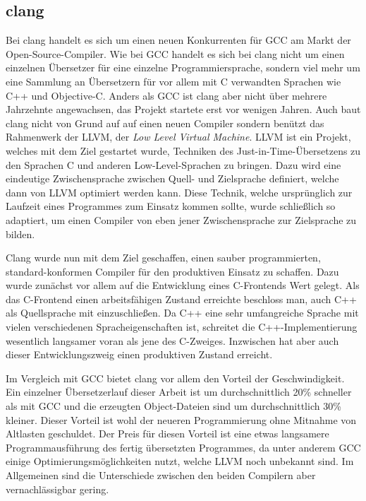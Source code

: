 \subsection{clang}
Bei clang handelt es sich um einen neuen Konkurrenten für GCC am Markt der Open-Source-Compiler. Wie bei GCC handelt es sich bei clang nicht um einen einzelnen Übersetzer für eine einzelne Programmiersprache,
sondern viel mehr um eine Sammlung an Übersetzern für vor allem mit C verwandten Sprachen wie C++ und Objective-C. Anders als GCC ist clang aber nicht über mehrere Jahrzehnte angewachsen, das Projekt
startete erst vor wenigen Jahren. Auch baut clang nicht von Grund auf auf einen neuen Compiler sondern benützt das Rahmenwerk der LLVM, der \textit{Low Level Virtual Machine}. LLVM ist ein Projekt, welches
mit dem Ziel gestartet wurde, Techniken des Just-in-Time-Übersetzens zu den Sprachen C und anderen Low-Level-Sprachen zu bringen. Dazu wird eine eindeutige Zwischensprache zwischen Quell- und Zielsprache
definiert, welche dann von LLVM optimiert werden kann. Diese Technik, welche ursprünglich zur Laufzeit eines Programmes zum Einsatz kommen sollte, wurde schließlich so adaptiert, um einen Compiler von
eben jener Zwischensprache zur Zielsprache zu bilden. 

Clang wurde nun mit dem Ziel geschaffen, einen sauber programmierten, standard-konformen Compiler für den produktiven Einsatz zu schaffen. Dazu wurde zunächst vor allem auf die Entwicklung eines C-Frontends
Wert gelegt. Als das C-Frontend einen arbeitsfähigen Zustand erreichte beschloss man, auch C++ als Quellsprache mit einzuschließen. Da C++ eine sehr umfangreiche Sprache mit vielen verschiedenen Spracheigenschaften 
ist, schreitet die C++-Implementierung wesentlich langsamer voran als jene des C-Zweiges. Inzwischen hat aber auch dieser Entwicklungszweig einen produktiven Zustand erreicht. 

Im Vergleich mit GCC bietet clang vor allem den Vorteil der Geschwindigkeit. Ein einzelner Übersetzerlauf dieser Arbeit ist um durchschnittlich 20\% schneller als mit GCC und die erzeugten Object-Dateien
sind um durchschnittlich 30\% kleiner. Dieser Vorteil ist wohl der neueren Programmierung ohne Mitnahme von Altlasten geschuldet. Der Preis für diesen Vorteil ist eine etwas langsamere Programmausführung
des fertig übersetzten Programmes, da unter anderem GCC einige Optimierungsmöglichkeiten nutzt, welche LLVM noch unbekannt sind. Im Allgemeinen sind die Unterschiede zwischen den beiden Compilern aber
vernachlässigbar gering.

